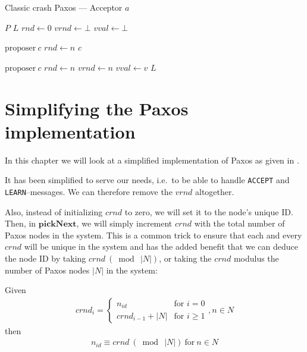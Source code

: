 \begin{algorithm}
  \caption{Classic crash Paxos --- Acceptor $a$}
  \label{algorithm:paxos.full.acceptor}
  \begin{algorithmic}
    \State $P$
    \State $L$
    \State $rnd \gets 0$
    \State $vrnd \gets \bot$
    \State $vval \gets \bot$
    \State

       {$\text{proposer}\ c$} 
         \State $rnd \gets n$
         \State {}
                       {$c$}
      \EndIf
    \EndOn
    \State

       {$\text{proposer}\ c$} 
        \State $rnd \gets n$
        \State $vrnd \gets n$
        \State $vval \gets v$
        \State {}
                      {$L$}
      \EndIf
    \EndOn
  \end{algorithmic}
\end{algorithm}


\section{Simplifying the Paxos implementation}

In this chapter we will look at a simplified implementation of Paxos as
given in \cite{Insane.Paxos}.

It has been simplified to serve our needs, i.e.~to be able to handle
\texttt{ACCEPT} and \texttt{LEARN}--messages.  We can therefore remove the
$vrnd$ altogether.


Also, instead of initializing $crnd$ to zero, we will set it to the node's
unique ID.  Then, in $\textbf{pickNext}$, we will simply increment $crnd$
with the total number of Paxos nodes in the system.  This is a common trick
to ensure that each and every $crnd$ will be unique in the system and has
the added benefit that we can deduce the node ID by taking
$crnd\ (\bmod\ |N|)$, or taking the $crnd$ modulus the number of Paxos nodes
$|N|$ in the system:

Given
\begin{gather}
  crnd_i = \left\{
             \begin{array}{ll}
               n_{id} & \mbox{for } i = 0 \\
               crnd_{i-1} + |N| & \mbox{for } i \geq 1
             \end{array}
           \right. , n \in N
\end{gather}
then
\begin{gather}
  n_{id} \equiv crnd\ (\bmod\ |N|)\ \text{for}\ n \in N
  \label{equation:crnd_mod_N}
\end{gather}

